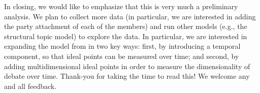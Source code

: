 \documentclass[12pt,letter]{article}
\begin{document}
In closing, we would like to emphasize that this is very much a preliminary analysis. We plan to collect more data (in particular, we are interested in adding the party attachment of each of the members) and run other models (e.g., the structural topic model) to explore the data. In particular, we are interested in expanding the model from \textcite{vafaTextBasedIdealPoints2020} in two key ways: first, by introducing a temporal component, so that ideal points can be measured over time; and second, by adding multidimensional ideal points in order to measure the dimensionality of debate over time. Thank-you for taking the time to read this! We welcome any and all feedback.
\par
\newpage
\printbibliography
\end{document}
